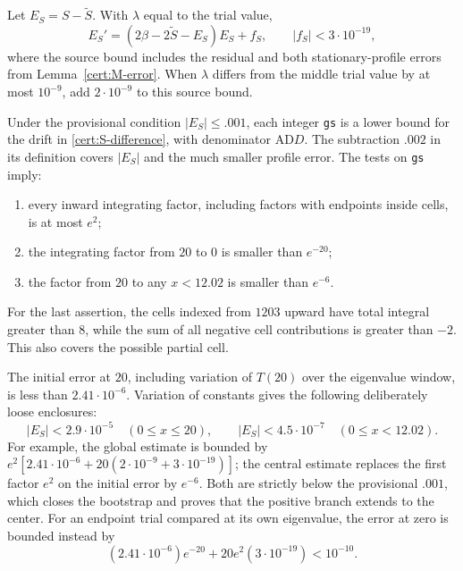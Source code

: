 \documentclass[11pt,a4paper]{article}
\numberwithin{equation}{section}
\theoremstyle{definition}
\theoremstyle{remark}
\begin{document}
Let $E_S=S-\widetilde S$.  With $\lambda$ equal to the trial value,
\begin{equation}\label{cert:S-difference}
 E_S'=(2\beta-2\widetilde S-E_S)E_S+f_S,
 \qquad |f_S|<3\cdot10^{-19},
\end{equation}
where the source bound includes the residual and both stationary-profile
errors from Lemma~\ref{cert:M-error}.  When $\lambda$ differs from the middle
trial value by at most $10^{-9}$, add $2\cdot10^{-9}$ to this source bound.

Under the provisional condition $|E_S|\le .001$, each integer \texttt{gs}
is a lower bound for the drift in \eqref{cert:S-difference}, with denominator
$\mathrm{AD}D$.  The subtraction $.002$ in its definition covers
$|E_S|$ and the much smaller profile error.  The tests on \texttt{gs} imply:
\begin{enumerate}
\item every inward integrating factor, including factors with endpoints
inside cells, is at most $e^2$;
\item the integrating factor from $20$ to $0$ is smaller than $e^{-20}$;
\item the factor from $20$ to any $x<12.02$ is smaller than $e^{-6}$.
\end{enumerate}
For the last assertion, the cells indexed from $1203$ upward have total
integral greater than $8$, while the sum of all negative cell contributions
is greater than $-2$.  This also covers the possible partial cell.

The initial error at $20$, including variation of $T(20)$ over the eigenvalue
window, is less than $2.41\cdot10^{-6}$.  Variation of constants gives the
following deliberately loose enclosures:
\begin{equation}\label{cert:S-errors}
 |E_S|<2.9\cdot10^{-5}\quad(0\le x\le20),\qquad
 |E_S|<4.5\cdot10^{-7}\quad(0\le x<12.02).
\end{equation}
For example, the global estimate is bounded by
$e^2[2.41\cdot10^{-6}+20(2\cdot10^{-9}+3\cdot10^{-19})]$;
the central estimate replaces the first factor $e^2$ on the initial error by
$e^{-6}$.  Both are strictly below the provisional $.001$, which closes the
bootstrap and proves that the positive branch extends to the center.
For an endpoint trial compared at its own eigenvalue, the error at zero is
bounded instead by
\[
 (2.41\cdot10^{-6})e^{-20}+20e^2(3\cdot10^{-19})<10^{-10}.
\]
\end{document}
